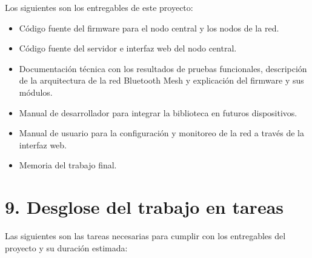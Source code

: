 \documentclass[
11pt, %
]{charter}
\begin{document}
Los siguientes son los entregables de este proyecto: 

\begin{itemize}
\item Código fuente del firmware para el nodo central y los nodos de la red.
\item Código fuente del servidor e interfaz web del nodo central.
\item Documentación técnica con los resultados de pruebas funcionales, descripción de la arquitectura de la red Bluetooth Mesh y explicación del firmware y sus módulos.
\item Manual de desarrollador para integrar la biblioteca en futuros dispositivos.
\item Manual de usuario para la configuración y monitoreo de la red a través de la interfaz web.
\item Memoria del trabajo final.
\end{itemize}

\section{9. Desglose del trabajo en tareas}
\label{sec:wbs}

Las siguientes son las tareas necesarias para cumplir con los entregables del proyecto y su duración estimada:
\end{document}
